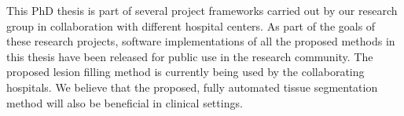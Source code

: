 This PhD thesis is part of several project frameworks carried out by our research group in collaboration with different hospital centers. As part of the goals of these research projects, software implementations of all the proposed methods in this thesis have been released for public use in the research community. The proposed lesion filling method is currently being used by the collaborating hospitals. We believe that the proposed, fully automated tissue segmentation method will also be beneficial in clinical settings.  










